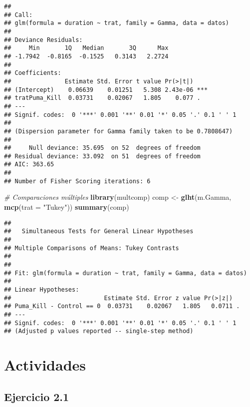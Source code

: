 \documentclass[
]{book}
\newenvironment{Shaded}{\begin{snugshade}}{\end{snugshade}}
\newcommand{\CommentTok}[1]{\textcolor[rgb]{0.56,0.35,0.01}{\textit{#1}}}
\newcommand{\DataTypeTok}[1]{\textcolor[rgb]{0.13,0.29,0.53}{#1}}
\newcommand{\KeywordTok}[1]{\textcolor[rgb]{0.13,0.29,0.53}{\textbf{#1}}}
\newcommand{\NormalTok}[1]{#1}
\newcommand{\StringTok}[1]{\textcolor[rgb]{0.31,0.60,0.02}{#1}}
\begin{document}
\begin{verbatim}
## 
## Call:
## glm(formula = duration ~ trat, family = Gamma, data = datos)
## 
## Deviance Residuals: 
##     Min       1Q   Median       3Q      Max  
## -1.7942  -0.8165  -0.1525   0.3143   2.2724  
## 
## Coefficients:
##               Estimate Std. Error t value Pr(>|t|)    
## (Intercept)    0.06639    0.01251   5.308 2.43e-06 ***
## tratPuma_Kill  0.03731    0.02067   1.805    0.077 .  
## ---
## Signif. codes:  0 '***' 0.001 '**' 0.01 '*' 0.05 '.' 0.1 ' ' 1
## 
## (Dispersion parameter for Gamma family taken to be 0.7808647)
## 
##     Null deviance: 35.695  on 52  degrees of freedom
## Residual deviance: 33.092  on 51  degrees of freedom
## AIC: 363.65
## 
## Number of Fisher Scoring iterations: 6
\end{verbatim}

\begin{Shaded}
\begin{Highlighting}[]
\CommentTok{# Comparaciones múltiples }
\KeywordTok{library}\NormalTok{(multcomp)}
\NormalTok{comp <-}\StringTok{ }\KeywordTok{glht}\NormalTok{(m.Gamma, }\KeywordTok{mcp}\NormalTok{(}\DataTypeTok{trat =} \StringTok{"Tukey"}\NormalTok{)) }
\KeywordTok{summary}\NormalTok{(comp)}
\end{Highlighting}
\end{Shaded}

\begin{verbatim}
## 
##   Simultaneous Tests for General Linear Hypotheses
## 
## Multiple Comparisons of Means: Tukey Contrasts
## 
## 
## Fit: glm(formula = duration ~ trat, family = Gamma, data = datos)
## 
## Linear Hypotheses:
##                          Estimate Std. Error z value Pr(>|z|)  
## Puma_Kill - Control == 0  0.03731    0.02067   1.805   0.0711 .
## ---
## Signif. codes:  0 '***' 0.001 '**' 0.01 '*' 0.05 '.' 0.1 ' ' 1
## (Adjusted p values reported -- single-step method)
\end{verbatim}

\hypertarget{actividades-1}{%
\section{Actividades}\label{actividades-1}}

\hypertarget{ejercicio-2.1}{%
\subsection{Ejercicio 2.1}\label{ejercicio-2.1}}
\end{document}
